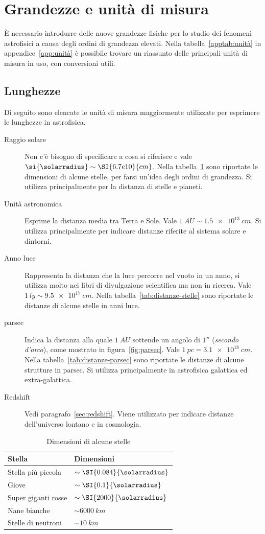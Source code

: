 \section{Grandezze e unità di misura}\label{sec:unità}
È necessario introdurre delle nuove grandezze fisiche per lo studio dei fenomeni astrofisici a causa degli ordini di grandezza elevati. Nella tabella~\ref{apptab:unità} in appendice~\ref{app:unità} è possibile trovare un riassunto delle principali unità di misura in uso, con conversioni utili.
\subsection{Lunghezze}
Di seguito sono elencate le unità di misura maggiormente utilizzate per esprimere le lunghezze in astrofisica.
\begin{description}
    \item[Raggio solare] Non c'è bisogno di specificare a cosa si riferisce e vale $\si{\solarradius} \sim \SI{6.7e10}{cm}$. Nella tabella~\ref{tab:dimensioni-stelle} sono riportate le dimensioni di alcune stelle, per farsi un'idea degli ordini di grandezza. Si utilizza principalmente per la distanza di stelle e pianeti.
    \item[Unità astronomica] Esprime la distanza media tra Terra e Sole. Vale $\SI{1}{AU} \sim \SI{1.5e13}{cm}$. Si utilizza principalmente per indicare distanze riferite al sistema solare e dintorni.
    \item[Anno luce] Rappresenta la distanza che la luce percorre nel vuoto in un anno, si utilizza molto nei libri di divulgazione scientifica ma non in ricerca. Vale $\SI{1}{ly} \sim \SI{9.5e17}{cm}$. Nella tabella~\ref{tab:distanze-stelle} sono riportate le distanze di alcune stelle in anni luce.
    \item[parsec] Indica la distanza alla quale $\SI{1}{AU}$ sottende un angolo di $\ang{;;1}$ (\emph{secondo d'arco}), come mostrato in figura~\ref{fig:parsec}. Vale $\SI{1}{pc} = \SI{3.1e18}{cm}$. Nella tabella~\ref{tab:distanze-parsec} sono riportate le distanze di alcune strutture in parsec. Si utilizza principalmente in astrofisica galattica ed extra-galattica.
    \item[Redshift] Vedi paragrafo~\ref{sec:redshift}. Viene utilizzato per indicare distanze dell'universo lontano e in cosmologia.
\end{description}

\begin{table}
\caption{Dimensioni di alcune stelle}
\label{tab:dimensioni-stelle}
\centering
\begin{tabular}{ll}
\toprule
Stella & Dimensioni \\
\midrule
Stella più piccola          & $\sim \SI{0.084}{\solarradius}$ \\
Giove           & $\sim \SI{0.1}{\solarradius}$    \\
Super giganti rosse             & $\sim \SI{2000}{\solarradius}$  \\
Nane bianche & $\sim \SI{6000}{km}$  \\
Stelle di neutroni & $\sim \SI{10}{km}$  \\
\bottomrule
\end{tabular}
\end{table}

